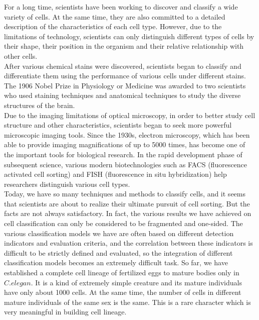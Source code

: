 For a long time, scientists have been working to discover and classify a wide variety of cells. At the same time, they are also committed to a detailed description of the characteristics of each cell type. However, due to the limitations of technology, scientists can only distinguish different types of cells by their shape, their position in the organism and their relative relationship with other cells. \\

After various chemical stains were discovered, scientists began to classify and differentiate them using the performance of various cells under different stains. The 1906 Nobel Prize in Physiology or Medicine was awarded to two scientists who used staining techniques and anatomical techniques to study the diverse structures of the brain. \\

Due to the imaging limitations of optical microscopy, in order to better study cell structure and other characteristics, scientists began to seek more powerful microscopic imaging tools. Since the 1930s, electron microscopy, which has been able to provide imaging magnifications of up to 5000 times, has become one of the important tools for biological research. In the rapid development phase of subsequent science, various modern biotechnologies such as FACS (fluorescence activated cell sorting) and FISH (fluorescence in situ hybridization) help researchers distinguish various cell types. \\

Today, we have so many techniques and methods to classify cells, and it seems that scientists are about to realize their ultimate pursuit of cell sorting. But the facts are not always satisfactory. In fact, the various results we have achieved on cell classification can only be considered to be fragmented and one-sided. The various classification models we have are often based on different detection indicators and evaluation criteria, and the correlation between these indicators is difficult to be strictly defined and evaluated, so the integration of different classification models becomes an extremely difficult task. So far, we have established a complete cell lineage of fertilized eggs to mature bodies only in $C. elegan$. It is a kind of extremely simple creature and its mature individuals have only about 1000 cells. At the same time, the number of cells in different mature individuals of the same sex is the same. This is a rare character which is very meaningful in building cell lineage. \\

